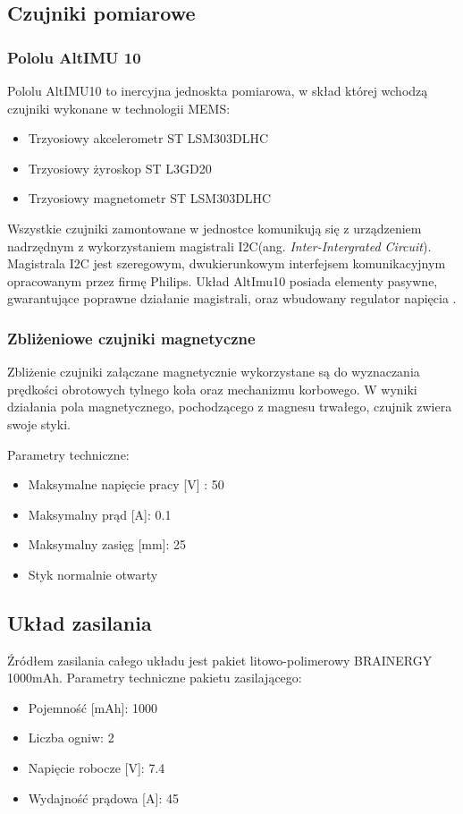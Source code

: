 \subsection{Czujniki pomiarowe}
\subsubsection{Pololu AltIMU 10}

Pololu AltIMU10 to inercyjna jednoskta pomiarowa, w skład której wchodzą czujniki wykonane w technologii MEMS:
\begin{itemize}
\item
Trzyosiowy akcelerometr ST LSM303DLHC
\item
Trzyosiowy żyroskop ST L3GD20
\item
Trzyosiowy magnetometr ST LSM303DLHC
\end{itemize}

Wszystkie czujniki zamontowane w jednostce komunikują się z urządzeniem nadrzędnym z wykorzystaniem magistrali I2C(ang. {\em Inter-Intergrated Circuit}). Magistrala I2C jest szeregowym, dwukierunkowym interfejsem komunikacyjnym opracowanym przez firmę Philips. Układ AltImu10 posiada elementy pasywne, gwarantujące poprawne działanie magistrali, oraz wbudowany regulator napięcia \cite{Pololu}.
\subsubsection{Zbliżeniowe czujniki magnetyczne}
Zbliżenie czujniki załączane magnetycznie wykorzystane są do wyznaczania prędkości obrotowych tylnego koła oraz mechanizmu korbowego. W wyniki działania pola magnetycznego, pochodzącego z magnesu trwałego, czujnik zwiera swoje styki. 
 
Parametry techniczne:
\begin{itemize}
\item
Maksymalne napięcie pracy [V] : 50
\item
Maksymalny prąd [A]: 0.1
\item
Maksymalny zasięg [mm]: 25
\item
Styk normalnie otwarty
\end{itemize}
\subsection{Układ zasilania}
Źródłem zasilania całego układu jest pakiet litowo-polimerowy BRAINERGY 1000mAh.
Parametry techniczne pakietu zasilającego:
\begin{itemize}
\item
Pojemność [mAh]: 1000
\item
Liczba ogniw: 2
\item
Napięcie robocze [V]: 7.4
\item
Wydajność prądowa [A]: 45
\end{itemize}

